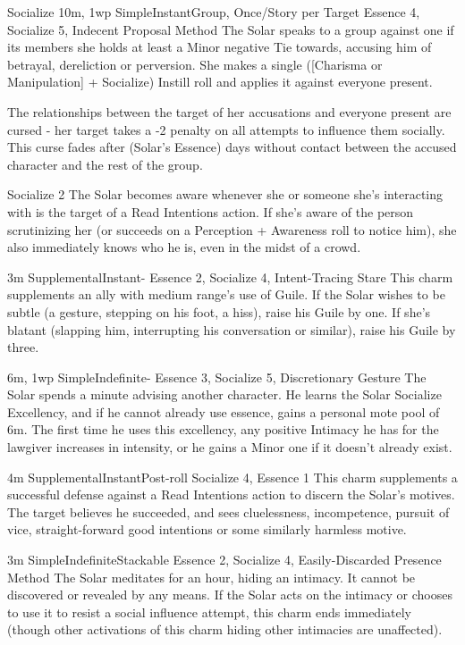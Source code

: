 \begin{Ability}{Socialize}
  {10m, 1wp}
  {Simple}{Instant}{Group, Once/Story per Target}
  {Essence 4, Socialize 5, Indecent Proposal Method}
  The Solar speaks to a group against one if its members she holds at least a Minor negative Tie towards, accusing him of betrayal, dereliction or perversion. She makes a single ([Charisma or Manipulation] + Socialize) Instill roll and applies it against everyone present.

  The relationships between the target of her accusations and everyone present are cursed - her target takes a -2 penalty on all attempts to influence them socially. This curse fades after (Solar's Essence) days without contact between the accused character and the rest of the group.

  {Socialize 2}
  The Solar becomes aware whenever she or someone she's interacting with is the target of a Read Intentions action. If she's aware of the person scrutinizing her (or succeeds on a Perception + Awareness roll to notice him), she also immediately knows who he is, even in the midst of a crowd.

  {3m}
  {Supplemental}{Instant}{-}
  {Essence 2, Socialize 4, Intent-Tracing Stare}
  This charm supplements an ally with medium range's use of Guile. If the Solar wishes to be subtle (a gesture, stepping on his foot, a hiss), raise his Guile by one. If she's blatant (slapping him, interrupting his conversation or similar), raise his Guile by three.

  {6m, 1wp}
  {Simple}{Indefinite}{-}
  {Essence 3, Socialize 5, Discretionary Gesture}
  The Solar spends a minute advising another character. He learns the Solar Socialize Excellency, and if he cannot already use essence, gains a personal mote pool of 6m. The first time he uses this excellency, any positive Intimacy he has for the lawgiver increases in intensity, or he gains a Minor one if it doesn't already exist.

  {4m}
  {Supplemental}{Instant}{Post-roll}
  {Socialize 4, Essence 1}
  This charm supplements a successful defense against a Read Intentions action to discern the Solar's motives. The target believes he succeeded, and sees cluelessness, incompetence, pursuit of vice, straight-forward good intentions or some similarly harmless motive.

  {3m}
  {Simple}{Indefinite}{Stackable}
  {Essence 2, Socialize 4, Easily-Discarded Presence Method}
  The Solar meditates for an hour, hiding an intimacy. It cannot be discovered or revealed by any means. If the Solar acts on the intimacy or chooses to use it to resist a social influence attempt, this charm ends immediately (though other activations of this charm hiding other intimacies are unaffected).


\end{Ability}

